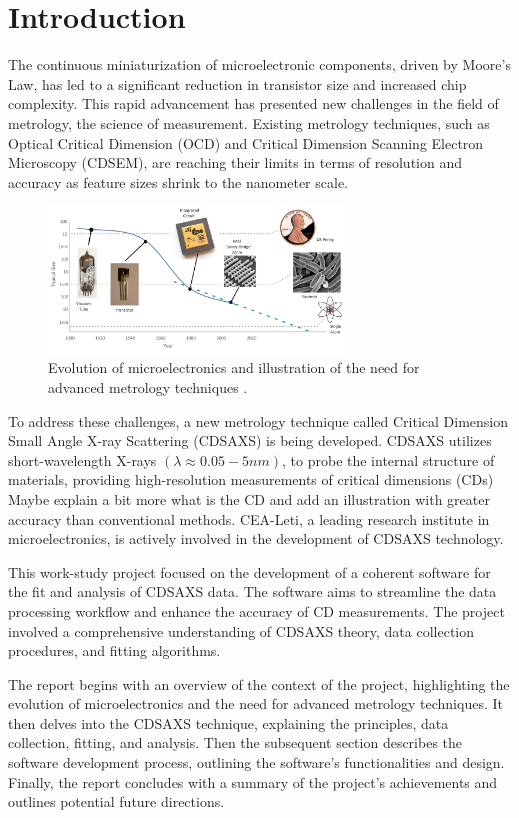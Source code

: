 \section{Introduction}

\medskip

The continuous miniaturization of microelectronic components, driven by Moore's Law, 
has led to a significant reduction in transistor size and increased chip complexity.
This rapid advancement has presented new challenges in the field of metrology, the science of measurement.
Existing metrology techniques, such as Optical Critical Dimension (OCD) and Critical Dimension Scanning 
Electron Microscopy (CDSEM), are reaching their limits in terms of resolution and accuracy as feature sizes
shrink to the nanometer scale.


\begin{figure}[h]
    \centering
    \includegraphics[width=0.7\textwidth]{images/moore's_law.png}
    \caption{Evolution of microelectronics and illustration of the need for advanced metrology techniques \cite{moore_law}.}
    \label{fig:evolution_microelectronics}
\end{figure}

\FloatBarrier

To address these challenges, a new metrology technique called Critical Dimension Small Angle X-ray Scattering
(CDSAXS) is being developed. CDSAXS utilizes short-wavelength X-rays $(\lambda \approx 0.05 - 5 nm)$, to probe the internal structure of
materials, providing high-resolution measurements of critical dimensions (CDs) \color{red} Maybe explain a bit more what is the CD and add an illustration \color{black} with greater accuracy than
conventional methods. CEA-Leti, a leading research institute in microelectronics, is actively involved in
the development of CDSAXS technology.

\medskip

This work-study project focused on the development of a coherent software for the fit and analysis of CDSAXS
data. The software aims to streamline the data processing workflow and enhance the accuracy of CD measurements.
The project involved a comprehensive understanding of CDSAXS theory, data collection procedures, and fitting
algorithms.

\medskip

The report begins with an overview of the context of the project, highlighting the evolution of
microelectronics and the need for advanced metrology techniques. It then delves into the CDSAXS technique, 
explaining the principles, data collection, fitting, and analysis. Then the subsequent
section describes the software development process, outlining the software's functionalities and design. Finally, the report concludes with a summary of the project's achievements and
outlines potential future directions.